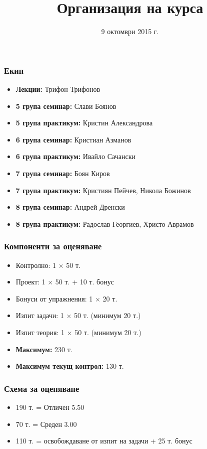 \documentclass{beamer}
\title{Организация на курса}
\date{9 октомври 2015 г.}
\begin{document}
\begin{frame}
  \titlepage
\end{frame}

\begin{frame}
  \frametitle{Екип}

  \begin{itemize}
  \item \textbf{Лекции:} Трифон Трифонов
  \item \textbf{5 група семинар:} Слави Боянов
  \item \textbf{5 група практикум:} Кристин Александрова
  \item \textbf{6 група семинар:} Кристиан Азманов
  \item \textbf{6 група практикум:} Ивайло Сачански
  \item \textbf{7 група семинар:} Боян Киров
  \item \textbf{7 група практикум:} Кристиян Пейчев, Никола Божинов
  \item \textbf{8 група семинар:} Андрей Дренски
  \item \textbf{8 група практикум:} Радослав Георгиев, Христо Аврамов
  \end{itemize}
\end{frame}

\begin{frame}
  \frametitle{Компоненти за оценяване}

  \begin{itemize}
  \item Контролно: 1 $\times$ 50 т.
  \item Проект: 1 $\times$ 50 т. + 10 т. бонус
  \item Бонуси от упражнения: 1 $\times$ 20 т.
  \item Изпит задачи: 1 $\times$ 50 т. (минимум 20 т.)
  \item Изпит теория: 1 $\times$ 50 т. (минимум 20 т.)
  \item \textbf{Максимум:} 230 т.
  \item \textbf{Максимум текущ контрол:} 130 т.
  \end{itemize}
\end{frame}

\begin{frame}
  \frametitle{Схема за оценяване}

  \begin{itemize}
  \item 190 т. = Отличен 5.50
  \item 70 т. = Среден 3.00
  \item 110 т. = освобождаване от изпит на задачи + 25 т. бонус
  \end{itemize}
\end{frame}
\end{document}
